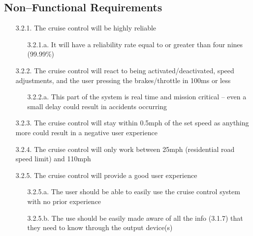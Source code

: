 \documentclass{article}
\begin{document}
	\subsection{Non--Functional Requirements}
	\begin{enumerate}
		\item[3.2.1.] The cruise control will be highly reliable
		\begin{enumerate}
			\item[3.2.1.a.] It will have a reliability rate equal to or greater than four nines (99.99\%)
		\end{enumerate}
		\item[3.2.2.] The cruise control will react to being activated/deactivated, speed adjustments, and the user pressing the brakes/throttle in 100ms or less
		\begin{enumerate}
			\item[3.2.2.a.] This part of the system is real time and mission critical -- even a small delay could result in accidents occurring 
		\end{enumerate}
		\item[3.2.3.] The cruise control will stay within 0.5mph of the set speed as anything more could result in a negative user experience
		\item[3.2.4.] The cruise control will only work between 25mph (residential road speed limit) and 110mph
		\item[3.2.5.] The cruise control will provide a good user experience
		\begin{enumerate}
			\item[3.2.5.a.] The user should be able to easily use the cruise control system with no prior experience
			\item[3.2.5.b.] The use should be easily made aware of all the info (3.1.7) that they need to know through the output device(s)
		\end{enumerate}
	\end{enumerate}
	
\end{document}

